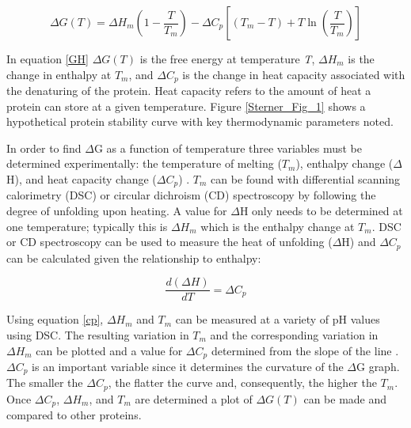 \begin{equation}\label{GH}
 \Delta G \left (  T \right )  =  \Delta  {H }_{m }  \left (  1 -  \frac{ T }{  {T }_{m } }  \right ) -  \Delta  {C }_{p } \left[   \left (  {T }_{m }  - T \right ) + T \ln  \left (   \frac{ T}{ { T}_{ m}  }  \right )  \right ] 
\end{equation}

In equation \eqref{GH} $\Delta G \left (  T \right )$ is the free energy at
temperature \emph{T}, $\Delta  {H }_{m }$ is the change in enthalpy at ${T }_{m
}$, and $\Delta  {C }_{p }$ is the change in heat capacity associated with the
denaturing of the protein. Heat capacity refers to the amount of heat a protein
can store at a given temperature.  Figure \ref{Sterner_Fig_1} shows a
hypothetical protein stability curve with key thermodynamic parameters noted.

In order to find $\Delta$G as a function of temperature three variables must be
determined experimentally: the temperature of melting (${T }_{m}$), enthalpy
change ($\Delta$H), and heat capacity change ($\Delta{C}_{p}$)
\cite{pace1997mcs}. ${T}_{m}$ can be found with differential scanning
calorimetry (DSC) or circular dichroism (CD) spectroscopy by following the
degree of unfolding upon heating. A value for $\Delta$H only needs to be
determined at one temperature; typically this is $\Delta{H}_{m}$ which is the
enthalpy change at ${T}_{m}$. DSC or CD spectroscopy can be used to measure
the heat of unfolding ($\Delta$H) and $\Delta{C}_{p}$ can be calculated given the
relationship to enthalpy:

\begin{equation}\label{cp}
\frac{ d \left ( \Delta H \right ) }{ dT }  = \Delta {C}_{p}
\end{equation}

Using equation \eqref{cp}, $\Delta{H}_{m}$ and ${T}_{m}$ can be measured at a
variety of pH values using DSC.  The resulting variation in ${T}_{m}$ and the
corresponding variation in $\Delta{H}_{m}$ can be plotted and a value for
$\Delta{C}_{p}$ determined from the slope of the line \cite{privalov1979sps}.
$\Delta  {C }_{p }$ is an important variable since it determines the curvature
of the $\Delta$G graph.  The smaller the $\Delta{C}_{p}$, the flatter the curve
and, consequently, the higher the ${T}_{m}$. Once $\Delta{C}_{p}$,
$\Delta{H}_{m}$, and ${T}_{m}$ are determined a plot of $\Delta G \left (  T
\right )$ can be made and compared to other proteins.

